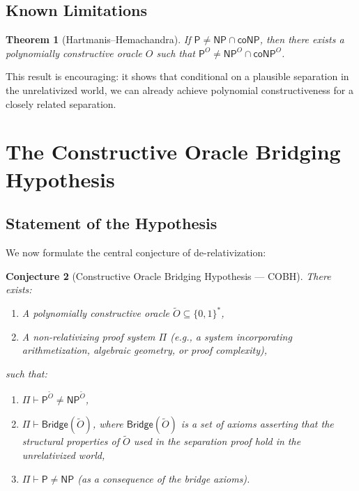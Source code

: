 \documentclass[11pt,a4paper]{article}
\theoremstyle{plain}
\newtheorem{theorem}{Theorem}[section]
\newtheorem{conjecture}[theorem]{Conjecture}
\theoremstyle{definition}
\theoremstyle{remark}
\newcommand{\PP}{\mathsf{P}}
\newcommand{\NP}{\mathsf{NP}}
\newcommand{\coNP}{\mathsf{coNP}}
\newcommand{\bitsstar}{\{0,1\}^*}
\begin{document}
\subsection{Known Limitations}

\begin{theorem}[Hartmanis--Hemachandra]\label{thm:HH}
If $\PP \neq \NP \cap \coNP$, then there exists a polynomially constructive
oracle $O$ such that $\PP^O \neq \NP^O \cap \coNP^O$.
\end{theorem}

This result \cite{HH87} is encouraging: it shows that conditional on a plausible
separation in the unrelativized world, we can already achieve polynomial
constructiveness for a closely related separation.

\section{The Constructive Oracle Bridging Hypothesis}\label{sec:bridging}

\subsection{Statement of the Hypothesis}

We now formulate the central conjecture of de-relativization:

\begin{conjecture}[Constructive Oracle Bridging Hypothesis — COBH]\label{conj:cobh}
There exists:
\begin{enumerate}[label=(\roman*)]
    \item A polynomially constructive oracle $\widetilde{O} \subseteq \bitsstar$,
    \item A non-relativizing proof system $\Pi$ (e.g., a system incorporating
    arithmetization, algebraic geometry, or proof complexity),
\end{enumerate}
such that:
\begin{enumerate}[label=(\alph*)]
    \item $\Pi \vdash \PP^{\widetilde{O}} \neq \NP^{\widetilde{O}}$,
    \item $\Pi \vdash \mathsf{Bridge}(\widetilde{O})$, where
    $\mathsf{Bridge}(\widetilde{O})$ is a set of axioms asserting that the
    structural properties of $\widetilde{O}$ used in the separation proof
    hold in the unrelativized world,
    \item $\Pi \vdash \PP \neq \NP$ (as a consequence of the bridge axioms).
\end{enumerate}
\end{conjecture}
\end{document}
